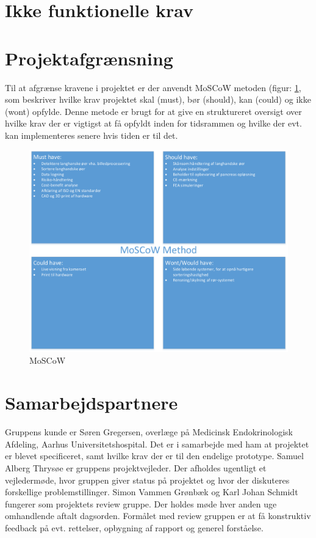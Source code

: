 \section{Ikke funktionelle krav}


\newpage

\newpage
\section{Projektafgrænsning}
Til at afgrænse kravene i projektet er der anvendt MoSCoW metoden (figur: \ref{fig:moscow}, som beskriver hvilke krav projektet skal (must), bør (should), kan (could) og ikke (wont) opfylde. Denne metode er brugt for at give en struktureret oversigt over hvilke krav der er vigtigst at få opfyldt inden for tidsrammen og hvilke der evt. kan implementeres senere hvis tiden er til det.

\begin{figure}[H]
	\centering
	\includegraphics[width=1\textwidth]{billeder/MoSCoW-crop.pdf}
	\caption{MoSCoW}
	\label{fig:moscow}
\end{figure}

\section{Samarbejdspartnere}
Gruppens kunde er Søren Gregersen, overlæge på Medicinsk Endokrinologisk Afdeling, Aarhus Universitetshospital. Det er i samarbejde med ham at projektet er blevet specificeret, samt hvilke krav der er til den endelige prototype.
Samuel Alberg Thrysøe er gruppens projektvejleder. Der afholdes ugentligt et vejledermøde, hvor gruppen giver status på projektet og hvor der diskuteres forskellige problemstillinger. 
Simon Vammen Grønbæk og Karl Johan Schmidt fungerer som projektets review gruppe. Der holdes møde hver anden uge omhandlende aftalt dagsorden. Formålet med review gruppen er at få konstruktiv feedback på evt. rettelser, opbygning af rapport og generel forståelse.
